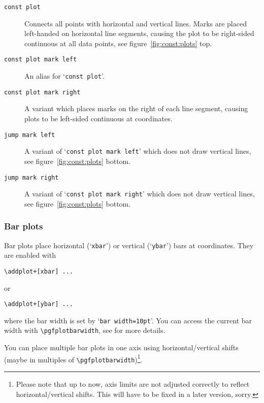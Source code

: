 \begin{description}
\item[\texttt{const plot}] Connects all points with horizontal and vertical lines. Marks are placed left-handed on horizontal line segments, causing the plot to be right-sided continuous at all data points, see figure~\ref{fig:const:plots} top.
\item[\texttt{const plot mark left}] An alias for `\texttt{const plot}'.
\item[\texttt{const plot mark right}] A variant which places marks on the right of each line segment, causing plots to be left-sided continuous at coordinates.
\item[\texttt{jump mark left}] A variant of `\texttt{const plot mark left}' which does not draw vertical lines, see figure~\ref{fig:const:plots} bottom.
\item[\texttt{jump mark right}]A variant of `\texttt{const plot mark right}' which does not draw vertical lines, see figure~\ref{fig:const:plots} bottom.
\end{description}

\subsubsection{Bar plots}
Bar plots place horizontal (`\texttt{xbar}') or vertical (`\texttt{ybar}') bars at coordinates. They are enabled with
\begin{lstlisting}
\addplot+[xbar] ...
\end{lstlisting}
or
\begin{lstlisting}
\addplot+[ybar] ...
\end{lstlisting}
where the bar width is set by `\lstinline!bar width=10pt!'. You can access the current bar width with \lstinline!\pgfplotbarwidth!, see \cite[section~18.8]{tikz} for more details.

You can place multiple bar plots in one axis using horizontal/vertical shifts (maybe in multiples of \verb|\pgfplotbarwidth|)\footnote{Please note that up to now, axis limits are not adjusted correctly to reflect horizontal/vertical shifts. This will have to be fixed in a later version, sorry.}.

